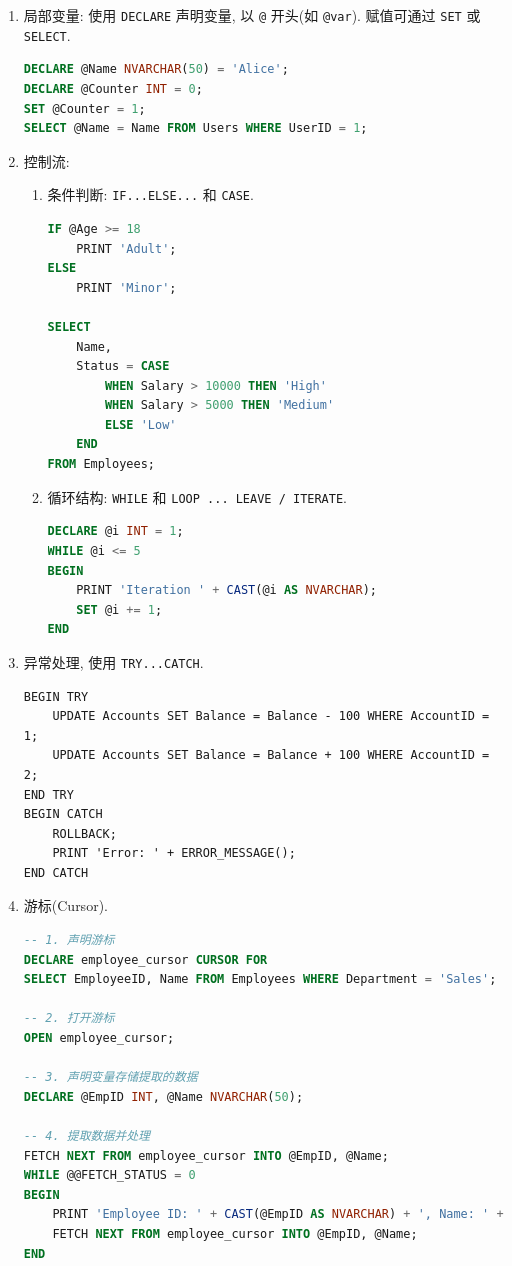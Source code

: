 \begin{enumerate}
    \item 局部变量: 使用 \verb|DECLARE| 声明变量, 以 \verb|@| 开头(如 \verb|@var|). 赋值可通过 \verb|SET| 或 \verb|SELECT|.
\begin{lstlisting}[language=SQL]
DECLARE @Name NVARCHAR(50) = 'Alice';
DECLARE @Counter INT = 0;
SET @Counter = 1;
SELECT @Name = Name FROM Users WHERE UserID = 1;
\end{lstlisting}
    \item 控制流:
    \begin{enumerate}
        \item 条件判断: \verb|IF...ELSE...| 和 \verb|CASE|.
\begin{lstlisting}[language=SQL]
IF @Age >= 18
    PRINT 'Adult';
ELSE
    PRINT 'Minor';

SELECT 
    Name,
    Status = CASE 
        WHEN Salary > 10000 THEN 'High'
        WHEN Salary > 5000 THEN 'Medium'
        ELSE 'Low'
    END
FROM Employees;
\end{lstlisting}
        \item 循环结构: \verb|WHILE| 和 \verb|LOOP ... LEAVE / ITERATE|.
\begin{lstlisting}[language=SQL]
DECLARE @i INT = 1;
WHILE @i <= 5
BEGIN
    PRINT 'Iteration ' + CAST(@i AS NVARCHAR);
    SET @i += 1;
END
\end{lstlisting}
    \end{enumerate}
      \item 异常处理, 使用 \verb|TRY...CATCH|.
\begin{lstlisting}
BEGIN TRY
    UPDATE Accounts SET Balance = Balance - 100 WHERE AccountID = 1;
    UPDATE Accounts SET Balance = Balance + 100 WHERE AccountID = 2;
END TRY
BEGIN CATCH
    ROLLBACK;
    PRINT 'Error: ' + ERROR_MESSAGE();
END CATCH
\end{lstlisting}
  \item 游标(Cursor).
\begin{lstlisting}[language=SQL]
-- 1. 声明游标
DECLARE employee_cursor CURSOR FOR
SELECT EmployeeID, Name FROM Employees WHERE Department = 'Sales';

-- 2. 打开游标
OPEN employee_cursor;

-- 3. 声明变量存储提取的数据
DECLARE @EmpID INT, @Name NVARCHAR(50);

-- 4. 提取数据并处理
FETCH NEXT FROM employee_cursor INTO @EmpID, @Name;
WHILE @@FETCH_STATUS = 0
BEGIN
    PRINT 'Employee ID: ' + CAST(@EmpID AS NVARCHAR) + ', Name: ' + @Name;
    FETCH NEXT FROM employee_cursor INTO @EmpID, @Name;
END


\end{lstlisting}
\end{enumerate}
